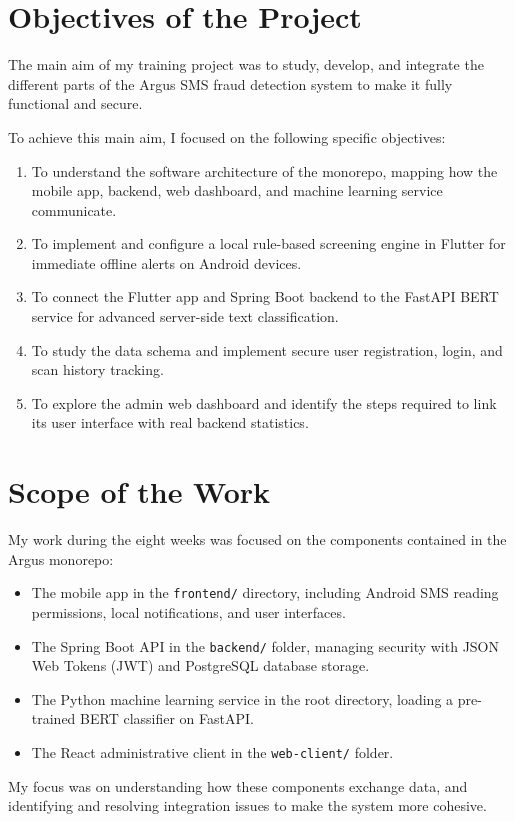 \section{Objectives of the Project}
The main aim of my training project was to study, develop, and integrate the different parts of the Argus SMS fraud detection system to make it fully functional and secure.

To achieve this main aim, I focused on the following specific objectives:
\begin{enumerate}
  \item To understand the software architecture of the monorepo, mapping how the mobile app, backend, web dashboard, and machine learning service communicate.
  \item To implement and configure a local rule-based screening engine in Flutter for immediate offline alerts on Android devices.
  \item To connect the Flutter app and Spring Boot backend to the FastAPI BERT service for advanced server-side text classification.
  \item To study the data schema and implement secure user registration, login, and scan history tracking.
  \item To explore the admin web dashboard and identify the steps required to link its user interface with real backend statistics.
\end{enumerate}

\section{Scope of the Work}
My work during the eight weeks was focused on the components contained in the Argus monorepo:
\begin{itemize}
  \item The mobile app in the \texttt{frontend/} directory, including Android SMS reading permissions, local notifications, and user interfaces.
  \item The Spring Boot API in the \texttt{backend/} folder, managing security with JSON Web Tokens (JWT) and PostgreSQL database storage.
  \item The Python machine learning service in the root directory, loading a pre-trained BERT classifier on FastAPI.
  \item The React administrative client in the \texttt{web-client/} folder.
\end{itemize}
My focus was on understanding how these components exchange data, and identifying and resolving integration issues to make the system more cohesive.

